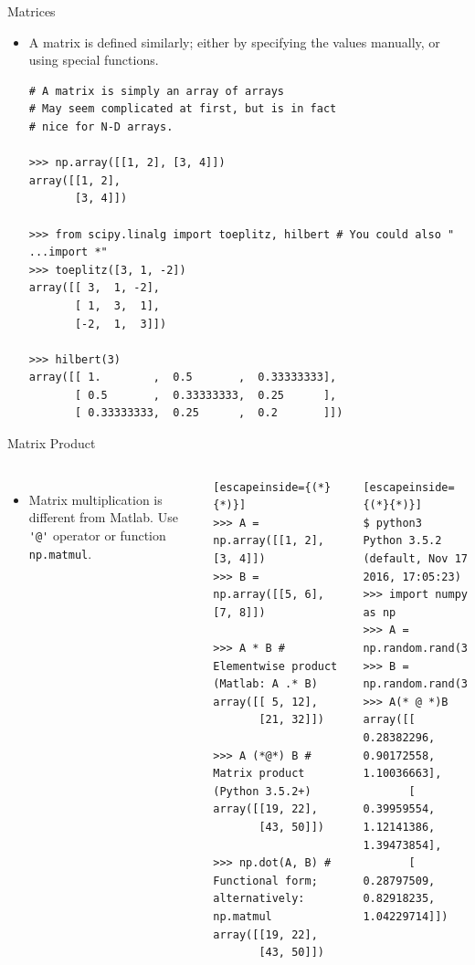 \documentclass[10pt, aspectratio=169]{beamer} %
\begin{document}
\begin{frame}[fragile,allowframebreaks=0.8]
 {Matrices}
\begin{itemize}
\item A matrix is defined similarly; either by specifying the values
manually, or using special functions.
\begin{lstlisting}
# A matrix is simply an array of arrays
# May seem complicated at first, but is in fact
# nice for N-D arrays.

>>> np.array([[1, 2], [3, 4]])
array([[1, 2],
       [3, 4]])

>>> from scipy.linalg import toeplitz, hilbert # You could also " ...import *"
>>> toeplitz([3, 1, -2])
array([[ 3,  1, -2],
       [ 1,  3,  1],
       [-2,  1,  3]])

>>> hilbert(3)
array([[ 1.        ,  0.5       ,  0.33333333],
       [ 0.5       ,  0.33333333,  0.25      ],
       [ 0.33333333,  0.25      ,  0.2       ]])
\end{lstlisting}
\end{itemize}
\end{frame}

\begin{frame}[fragile,allowframebreaks=0.8]
{Matrix Product}
\begin{columns}%
\begin{itemize}
\item Matrix multiplication is different from Matlab.
Use \verb+'@'+ operator or function \verb+np.matmul+.
\end{itemize}
\begin{lstlisting}[escapeinside={(*}{*)}]
>>> A = np.array([[1, 2], [3, 4]])
>>> B = np.array([[5, 6], [7, 8]])

>>> A * B # Elementwise product (Matlab: A .* B)
array([[ 5, 12],
       [21, 32]])

>>> A (*@*) B # Matrix product (Python 3.5.2+)
array([[19, 22],
       [43, 50]])
			
>>> np.dot(A, B) # Functional form; alternatively: np.matmul
array([[19, 22],
       [43, 50]])
\end{lstlisting}

\begin{lstlisting}[escapeinside={(*}{*)}]
$ python3
Python 3.5.2 (default, Nov 17 2016, 17:05:23) 
>>> import numpy as np
>>> A = np.random.rand(3,3)
>>> B = np.random.rand(3,3)
>>> A(* @ *)B
array([[ 0.28382296,  0.90172558,  1.10036663],
       [ 0.39959554,  1.12141386,  1.39473854],
       [ 0.28797509,  0.82918235,  1.04229714]])
\end{lstlisting}
\end{columns}
\end{frame}
\end{document}
